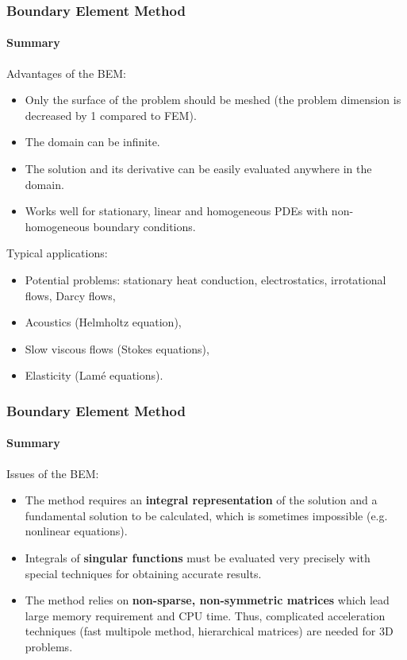 \documentclass[10pt,xcolor=pdftex,dvipsnames,table]{beamer}
\begin{document}
\begin{frame}
	\frametitle{ Boundary Element Method }
	\framesubtitle{ Summary }
	
	Advantages of the BEM:
	\begin{itemize}
		\item Only the surface of the problem should be meshed (the problem dimension is decreased by 1 compared to FEM).
		\item The domain can be infinite.
		\item The solution and its derivative can be easily evaluated anywhere in the domain.
		\item Works well for stationary, linear and homogeneous PDEs with non-homogeneous boundary conditions.
	\end{itemize}
	
	
	Typical applications:
	\begin{itemize}
		\item Potential problems: stationary heat conduction, electrostatics, irrotational flows, Darcy flows,
		\item Acoustics (Helmholtz equation),
		\item Slow viscous flows (Stokes equations),
		\item Elasticity (Lamé equations).
	\end{itemize}

\end{frame}



\begin{frame}
	\frametitle{ Boundary Element Method }
	\framesubtitle{ Summary }
	
	Issues of the BEM:
	\begin{itemize}
		\item The method requires an \textbf{integral representation} of the solution and a fundamental solution to be calculated, which is sometimes impossible (e.g. nonlinear equations).
		\item Integrals of \textbf{singular functions} must be evaluated very precisely with special techniques for obtaining accurate results.
		\item The method relies on \textbf{non-sparse, non-symmetric matrices} which lead large memory requirement and CPU time. Thus, complicated acceleration techniques (fast multipole method, hierarchical matrices) are needed for 3D problems.
	\end{itemize}
\end{frame}
\end{document}

